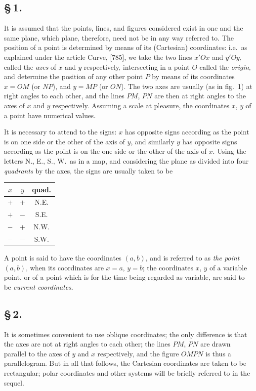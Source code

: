 \documentclass[11pt,a4paper]{book}
\begin{document}
\subsection*{\S\,1.}

It is assumed that the points, lines, and figures considered exist in one and the same plane, which plane, therefore, need not be in any way referred to. The position of a point is determined by means of its (Cartesian) coordinates: i.e.\ as explained under the article Curve, [785], we take the two lines $x'Ox$ and $y'Oy$, called the \textit{axes} of $x$ and $y$ respectively, intersecting in a point $O$ called the \textit{origin}, and determine the position of any other point $P$ by means of its coordinates $x = OM$ (or $NP$), and $y = MP$ (or $ON$). The two axes are usually (as in fig.~1) at right angles to each other, and the lines $PM$, $PN$ are then at right angles to the axes of $x$ and $y$ respectively. Assuming a scale at pleasure, the coordinates $x$, $y$ of a point have numerical values.

It is necessary to attend to the signs: $x$ has opposite signs according as the point is on one side or the other of the axis of $y$, and similarly $y$ has opposite signs according as the point is on the one side or the other of the axis of $x$. Using the letters N., E., S., W.\ as in a map, and considering the plane as divided into four \textit{quadrants} by the axes, the signs are usually taken to be
\begin{center}
\begin{tabular}{c|c|c}
$x$ & $y$ & quad. \\ \hline
$+$ & $+$ & N.E. \\
$+$ & $-$ & S.E. \\
$-$ & $+$ & N.W. \\
$-$ & $-$ & S.W.
\end{tabular}
\end{center}
A point is said to have the coordinates $(a, b)$, and is referred to as \textit{the point $(a, b)$}, when its coordinates are $x = a$, $y = b$; the coordinates $x$, $y$ of a variable point, or of a point which is for the time being regarded as variable, are said to be \textit{current coordinates}.

\subsection*{\S\,2.}

It is sometimes convenient to use oblique coordinates; the only difference is that the axes are not at right angles to each other; the lines $PM$, $PN$ are drawn parallel to the axes of $y$ and $x$ respectively, and the figure $OMPN$ is thus a parallelogram. But in all that follows, the Cartesian coordinates are taken to be rectangular; polar coordinates and other systems will be briefly referred to in the sequel.
\end{document}
